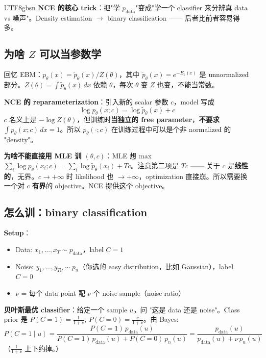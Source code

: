 \documentclass[11pt]{article}
\begin{document}
\begin{CJK}{UTF8}{gbsn}
\textbf{NCE 的核心 trick}：把"学 $p_{\text{data}}$"变成"学一个 classifier 来分辨真 data vs 噪声"。Density estimation $\to$ binary classification —— 后者比前者容易得多。

\subsection{为啥 $Z$ 可以当参数学}

回忆 EBM：$p_\theta(x) = \tilde{p}_\theta(x) / Z(\theta)$，其中 $\tilde{p}_\theta(x) = e^{-E_\theta(x)}$ 是 unnormalized 部分。$Z(\theta) = \int \tilde{p}_\theta(x) \, dx$ 依赖 $\theta$，每次 $\theta$ 变 $Z$ 也变，不能当常数。

\textbf{NCE 的 reparameterization}：引入新的 scalar 参数 $c$，model 写成
\[
\log p_\theta(x; c) = \log \tilde{p}_\theta(x) + c
\]
$c$ 名义上是 $-\log Z(\theta)$，但训练时\textbf{当独立的 free parameter}，\textbf{不要求} $\int p_\theta(x; c) \, dx = 1$。所以 $p_\theta(\cdot; c)$ 在训练过程中可以是个非 normalized 的 "density"。

\textbf{为啥不能直接用 MLE 训 $(\theta, c)$}：MLE 想 max $\sum_i \log p_\theta(x_i; c) = \sum_i \log \tilde{p}_\theta(x_i) + Tc$。注意第二项是 $Tc$ —— 关于 $c$ 是\textbf{线性的}，无界。$c \to +\infty$ 时 likelihood 也 $\to +\infty$，optimization 直接崩。所以需要换一个对 $c$ \textbf{有界}的 objective。NCE 提供这个 objective。

\subsection{怎么训：binary classification}

\textbf{Setup}：
\begin{itemize}[nosep]
  \item Data: $x_1, \ldots, x_T \sim p_{\text{data}}$，label $C = 1$
  \item Noise: $y_1, \ldots, y_{T\nu} \sim p_n$（你选的 easy distribution，比如 Gaussian），label $C = 0$
  \item $\nu$ = 每个 data point 配 $\nu$ 个 noise sample（noise ratio）
\end{itemize}

\textbf{贝叶斯最优 classifier}：给定一个 sample $u$，问 "这是 data 还是 noise"。Class prior 是 $P(C=1) = \frac{1}{1+\nu}$, $P(C=0) = \frac{\nu}{1+\nu}$。由 Bayes:
\[
P(C=1 \mid u) = \frac{P(C=1) \, p_{\text{data}}(u)}{P(C=1) \, p_{\text{data}}(u) + P(C=0) \, p_n(u)} = \frac{p_{\text{data}}(u)}{p_{\text{data}}(u) + \nu \, p_n(u)}
\]
（$\frac{1}{1+\nu}$ 上下约掉。）


\end{CJK}
\end{document}
